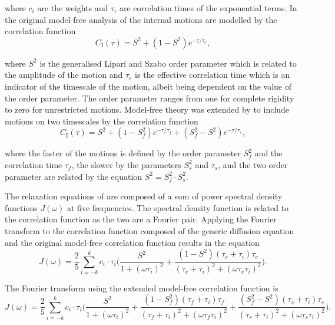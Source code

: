 \noindent where $c_i$ are the weights and $\tau_i$ are correlation times of the exponential terms.  In the original model-free analysis of \citet{LipariSzabo82a,LipariSzabo82b} the internal motions are modelled by the correlation function
\begin{equation}
    C_\mathrm{I}(\tau) = S^2 + (1 - S^2) e^{-\tau / \tau_e},
\end{equation}

\noindent where $S^2$ is the generalised Lipari and Szabo order parameter which is related to the amplitude of the motion and $\tau_e$ is the effective correlation time which is an indicator of the timescale of the motion, albeit being dependent on the value of the order parameter.  The order parameter ranges from one for complete rigidity to zero for unrestricted motions.  Model-free theory was extended by \citet{Clore90a} to include motions on two timescales by the correlation function
\begin{equation}
    C_\mathrm{I}(\tau) = S^2 + (1 - S^2_f) e^{-\tau / \tau_f} + (S^2_f - S^2) e^{-\tau / \tau_s},
\end{equation}

\noindent where the faster of the motions is defined by the order parameter $S^2_f$ and the correlation time $\tau_f$, the slower by the parameters $S^2_s$ and $\tau_s$, and the two order parameter are related by the equation $S^2 = S^2_f \cdot S^2_s$.

The relaxation equations of \citet{Abragam61} are composed of a sum of power spectral density functions $J(\omega)$ at five frequencies.  The spectral density function is related to the correlation function as the two are a Fourier pair.  Applying the Fourier transform to the correlation function composed of the generic diffusion equation and the original model-free correlation function results in the equation
\begin{equation} \label{eq: maths: J(w) model-free generic}
    J(\omega) = \frac{2}{5} \sum_{i=-k}^k c_i \cdot \tau_i \Bigg(
        \frac{S^2}{1 + (\omega \tau_i)^2}
        + \frac{(1 - S^2)(\tau_e + \tau_i)\tau_e}{(\tau_e + \tau_i)^2 + (\omega \tau_e \tau_i)^2}
    \Bigg).
\end{equation}

The Fourier transform using the extended model-free correlation function is
\begin{equation} \label{eq: maths: J(w) model-free ext generic}
    J(\omega) = \frac{2}{5} \sum_{i=-k}^k c_i \cdot \tau_i \Bigg(
        \frac{S^2}{1 + (\omega \tau_i)^2}
        + \frac{(1 - S^2_f)(\tau_f + \tau_i)\tau_f}{(\tau_f + \tau_i)^2 + (\omega \tau_f \tau_i)^2}
        + \frac{(S^2_f - S^2)(\tau_s + \tau_i)\tau_s}{(\tau_s + \tau_i)^2 + (\omega \tau_s \tau_i)^2}
    \Bigg).
\end{equation}



